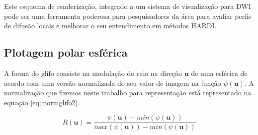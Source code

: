 \documentclass[
    12pt,                %
    oneside,            %
    a4paper,            %
    english,            %
    french,                %
    spanish,            %
    brazil                %
    ]{abntex2}
\begin{document}
Este esquema de renderização, integrado a um sistema de visualização para DWI pode ser uma ferramenta poderosa para pesquisadores da área para avaliar perfis de difusão locais e melhorar o seu entendimento em métodos HARDI.






\subsection{Plotagem polar esférica}

A forma do glifo consiste na modulação do raio na direção $\mathbf{u}$ de uma esférica de acordo com uma versão normalizada do seu valor de imagem na função $\psi(\mathbf{u})$. A normalização que fizemos neste trabalho para representação está representado na equação \ref{eq::normglifo2}.

\begin{equation}
\label{eq::normglifo2}
    R(\mathbf{u}) = \frac{\psi(\mathbf{u}) - min(\psi(\mathbf{u}))}{max(\psi(\mathbf{u})) - min(\psi(\mathbf{u}))}
\end{equation}
\end{document}
